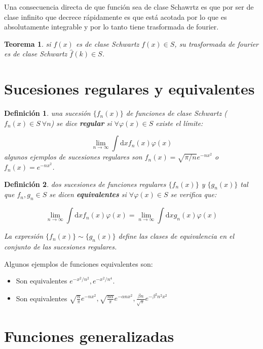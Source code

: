 \documentclass[12pt,a4paper]{book}
\newcommand{\D}{\mathrm{d}}
\newcommand{\hatf}{\widehat{f}}
\newtheorem{theorem}{Teorema}[section]
\newtheorem{definicion}{Definición}[section]
\begin{document}
Una consecuencia directa de que función sea de clase Schawrtz es que por ser de clase infinito que decrece rápidamente es que está acotada por lo que es absolutamente integrable y por lo tanto tiene trasformada de fourier. 

\begin{theorem}
si $f(x)$ es de clase Schwartz $f(x) \in S$, su trasformada de fourier es de clase Schwartz $\hatf (k) \in S$. 
\end{theorem}

\section{Sucesiones regulares y equivalentes}


\begin{definicion}
una sucesión $\{ f_n (x) \}$ de funciones de clase Schwartz ($f_n (x) \in S \ \forall n$) se dice \textbf{regular} si $\forall \varphi (x) \in S$ existe el límite:

$$ \lim_{n \rightarrow \infty} \int \D x f_n (x) \varphi (x)  $$
algunos ejemplos de sucesiones regulares son $f_n (x) = \sqrt{\pi/n} e^{-nx^2}$ o $f_n (x) = e^{-nx^2}$.
\end{definicion}

\begin{definicion}
dos sucesiones de funciones regulares $\{ f_n (x) \}  $ y $ \{ g_n(x) \}$ tal que $f_n, g_n \in S$ se dicen \textbf{equivalentes} si $\forall \varphi (x) \in S$ se verifica que:

$$ \lim_{n \rightarrow \infty} \int \D x f_n (x) \varphi (x) =  \lim_{n \rightarrow \infty} \int \D x g_n (x) \varphi (x)  $$

La expresión  $\{ f_n (x) \}  \sim \{ g_n(x) \}$ define las clases de equivalencia en el conjunto de las sucesiones regulares.
\end{definicion}
Algunos ejemplos de funciones equivalentes son:

\begin{itemize}
\item Son equivalentes $e^{-x^2/n^2}, e^{-x^2/n^4}$.

\item Son equivalentes $\sqrt{\frac{n}{\pi}} e^{-nx^2}, \sqrt{\frac{n \alpha}{\pi}} e^{-\alpha nx^2}, \frac{\beta n}{\sqrt{\pi}} e^{-\beta^2 n^2 x^2}$
\end{itemize}


\section{Funciones generalizadas}
\end{document}
